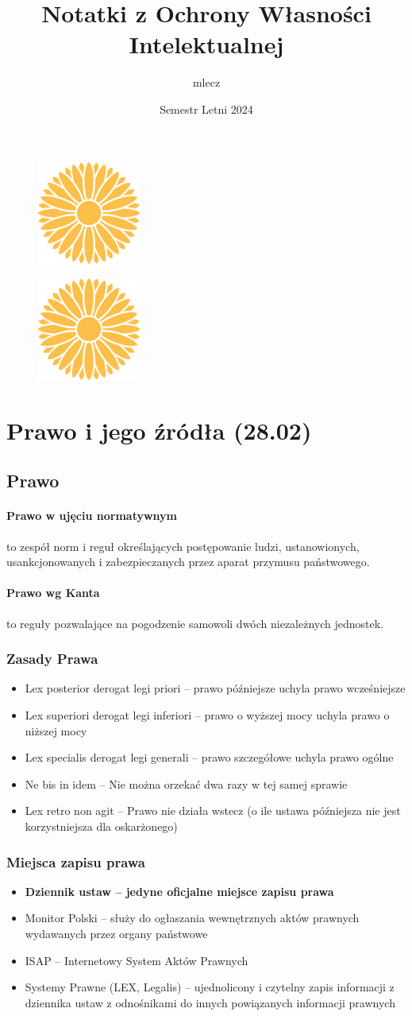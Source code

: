 \documentclass{article}
\title{Notatki z Ochrony Własności Intelektualnej}
\author{mlecz}
\date{Semestr Letni 2024}
\newcommand{\watermark}{
  \begin{figure}[b]
    \transparent{0.4} \includegraphics*[]{mlecz}
    \centering
  \end{figure}
}
\begin{document}
\maketitle
\watermark

\tableofcontents
\watermark

\section{Prawo i jego źródła (28.02)}

\subsection{Prawo}

\paragraph{Prawo w ujęciu normatywnym}
to zespół norm i reguł określających postępowanie ludzi, ustanowionych, usankcjonowanych i zabezpieczanych przez aparat przymusu państwowego.

\paragraph{Prawo wg Kanta}
to reguły pozwalające na pogodzenie samowoli dwóch niezależnych jednostek.

\subsubsection{Zasady Prawa}
\begin{itemize}
  \item Lex posterior derogat legi priori -- prawo późniejsze uchyla prawo wcześniejsze
  \item Lex superiori derogat legi inferiori -- prawo o wyższej mocy uchyla prawo o niższej mocy
  \item Lex specialis derogat legi generali -- prawo szczegółowe uchyla prawo ogólne
  \item Ne bis in idem -- Nie można orzekać dwa razy w tej samej sprawie
  \item Lex retro non agit -- Prawo nie działa wstecz (o ile ustawa późniejsza nie jest
        korzystniejsza dla oskarżonego)
\end{itemize}

\subsubsection{Miejsca zapisu prawa}
\begin{itemize}
  \item \textbf{Dziennik ustaw -- jedyne oficjalne miejsce zapisu prawa}
  \item Monitor Polski -- służy do ogłaszania wewnętrznych aktów prawnych wydawanych
        przez organy państwowe
  \item ISAP -- Internetowy System Aktów Prawnych
  \item Systemy Prawne (LEX, Legalis) -- ujednolicony i czytelny zapis informacji
        z dziennika ustaw z odnośnikami do innych powiązanych informacji prawnych
\end{itemize}
\end{document}
